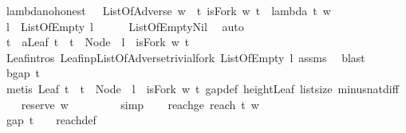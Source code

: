 \begin{isabellebody}
\isamarkupfalse%
\ lambda{\isacharunderscore}no{\isacharunderscore}honest\ {\isacharcolon}\ \ {\isachardoublequoteopen}ListOfAdverse\ w{\isachardoublequoteclose}\ \ {\isachardoublequoteopen}{\isasymexists}t{\isachardot}\ isFork\ w\ t\ {\isasymand}\ lambda\ t\ w\ {\isasymge}\ {}{\isachardoublequoteclose}\isanewline
%
\isadelimproof
%
\endisadelimproof
%
\isatagproof
{}\isamarkupfalse%
\ {\isacharminus}\isanewline
\ \ \isamarkupfalse%
\ l\ \ {\isachardoublequoteopen}ListOfEmpty\ l{\isachardoublequoteclose}\isanewline
\ \ \ \ \isamarkupfalse%
\ ListOfEmpty{\isachardot}Nil\ \isamarkupfalse%
\ auto\ \isanewline
\ \ \isamarkupfalse%
\ t\ \ a{\isacharcolon}{\isachardoublequoteopen}Leaf\ t\ {\isasymand}\ t\ {\isacharequal}\ Node\ {}\ l\ {\isasymand}\ isFork\ w\ t{\isachardoublequoteclose}\isanewline
\ \ \ \ \isamarkupfalse%
\ Leaf{\isachardot}intros\ Leaf{\isacharunderscore}inp{\isacharunderscore}ListOfAdverse{\isacharunderscore}trivial{\isacharunderscore}fork\ {\isacartoucheopen}ListOfEmpty\ l{\isacartoucheclose}\ assms\ \isamarkupfalse%
\ blast\isanewline
\ \ \isamarkupfalse%
\ b{\isacharcolon}{\isachardoublequoteopen}gap\ t\ {\isacharbrackleft}{\isacharbrackright}\ {\isacharequal}\ {}{\isachardoublequoteclose}\isanewline
\ \ \ \ \isamarkupfalse%
\ {\isacharparenleft}metis\ {\isacartoucheopen}Leaf\ t\ {\isasymand}\ t\ {\isacharequal}\ Node\ {}\ l\ {\isasymand}\ isFork\ w\ t{\isacartoucheclose}\ gap{\isacharunderscore}def\ height{\isacharunderscore}Leaf\ list{\isachardot}size{\isacharparenleft}{}{\isacharparenright}\ minus{\isacharunderscore}nat{\isachardot}diff{\isacharunderscore}{}{\isacharparenright}\isanewline
\ \ \isamarkupfalse%
\ {\isachardoublequoteopen}reserve\ w\ {\isacharbrackleft}{\isacharbrackright}\ {\isasymge}\ {}{\isachardoublequoteclose}\isanewline
\ \ \ \ \isamarkupfalse%
\ simp\isanewline
\ \ \isamarkupfalse%
\ reachge{}{\isacharcolon}\ {\isachardoublequoteopen}reach\ t\ w\ {\isacharbrackleft}{\isacharbrackright}\ {\isasymge}\ {}{\isachardoublequoteclose}\ \isanewline
\ \ \ \ \isamarkupfalse%
\ {\isacartoucheopen}gap\ t\ {\isacharbrackleft}{\isacharbrackright}\ {\isacharequal}\ {}{\isacartoucheclose}\ reach{\isacharunderscore}def\ \isamarkupfalse%

\end{isabellebody}
